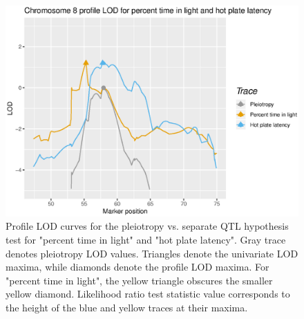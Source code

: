 \documentclass[12pt,twoside, lineno]{gsajnl}
\begin{document}
\begin{figure}
\includegraphics[width = \textwidth]{../Rmd/profile.eps}
\caption{Profile LOD curves for the pleiotropy vs. separate QTL hypothesis test for "percent time in light" and "hot plate latency". Gray trace denotes pleiotropy LOD values. Triangles denote the univariate LOD maxima, while diamonds denote the profile LOD maxima. For "percent time in light", the yellow triangle obscures the smaller yellow diamond. Likelihood ratio test statistic value corresponds to the height of the blue and yellow traces at their maxima.}
\label{fig:profiles}
\end{figure}








\end{document}
